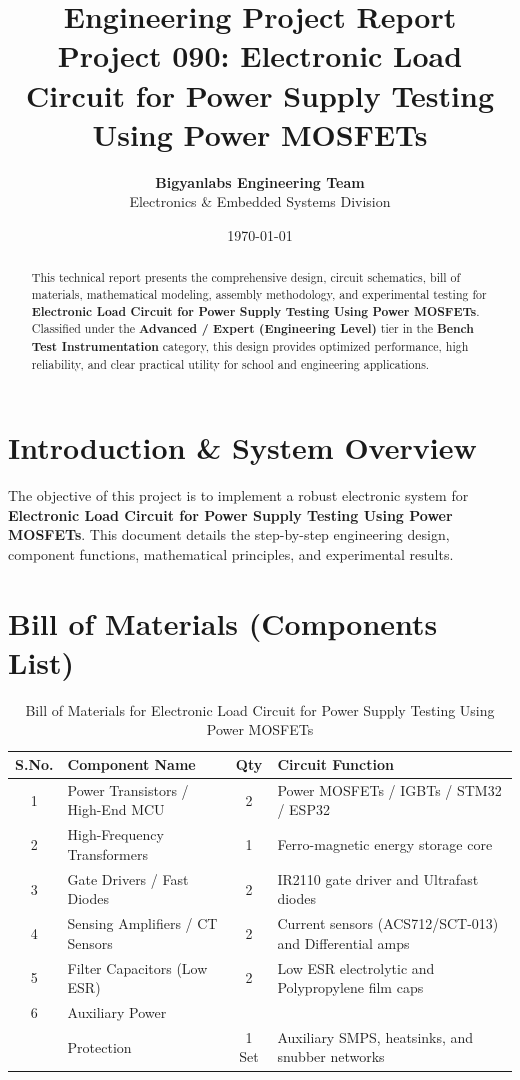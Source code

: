 \documentclass[11pt,a4paper]{article}
\title{\textbf{\Huge Engineering Project Report}\\[0.5em] \Large Project 090: Electronic Load Circuit for Power Supply Testing Using Power MOSFETs}
\author{\textbf{Bigyanlabs Engineering Team}\\ Electronics \& Embedded Systems Division}
\date{\today}
\begin{document}
\maketitle
\thispagestyle{empty}

\begin{abstract}
This technical report presents the comprehensive design, circuit schematics, bill of materials, mathematical modeling, assembly methodology, and experimental testing for \textbf{Electronic Load Circuit for Power Supply Testing Using Power MOSFETs}. Classified under the \textbf{Advanced / Expert (Engineering Level)} tier in the \textbf{Bench Test Instrumentation} category, this design provides optimized performance, high reliability, and clear practical utility for school and engineering applications.
\end{abstract}

\newpage
\tableofcontents
\newpage

\section{Introduction \& System Overview}
The objective of this project is to implement a robust electronic system for \textbf{Electronic Load Circuit for Power Supply Testing Using Power MOSFETs}. This document details the step-by-step engineering design, component functions, mathematical principles, and experimental results.

\section{Bill of Materials (Components List)}
\begin{table}[h!]
\centering
\caption{Bill of Materials for Electronic Load Circuit for Power Supply Testing Using Power MOSFETs}
\vspace{0.5em}
\begin{tabular}{clcp{7cm}}
\toprule
\textbf{S.No.} & \textbf{Component Name} & \textbf{Qty} & \textbf{Circuit Function} \\
\midrule
1 & Power Transistors / High-End MCU & 2 & Power MOSFETs / IGBTs / STM32 / ESP32 \\
2 & High-Frequency Transformers & 1 & Ferro-magnetic energy storage core \\
3 & Gate Drivers / Fast Diodes & 2 & IR2110 gate driver and Ultrafast diodes \\
4 & Sensing Amplifiers / CT Sensors & 2 & Current sensors (ACS712/SCT-013) and Differential amps \\
5 & Filter Capacitors (Low ESR) & 2 & Low ESR electrolytic and Polypropylene film caps \\
6 & Auxiliary Power \\& Protection & 1 Set & Auxiliary SMPS, heatsinks, and snubber networks \\
\bottomrule
\end{tabular}
\end{table}
\end{document}
